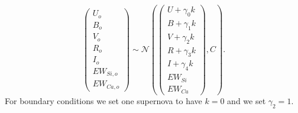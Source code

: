 \documentclass[11pt, oneside]{article}   	%
\begin{document}
\begin{equation}
\left(
\begin{matrix}
U_o\\B_o\\ V_o\\R_o\\I_o\\EW_{Si, o}\\ EW_{Ca, o}
\end{matrix}
\right) \sim \mathcal{N}
\left(
\left(
\begin{matrix}
U +\gamma_0 k \\B +\gamma_1 k \\V+\gamma_2 k\\R+\gamma_3 k\\I+\gamma_4 k\\
EW_{Si}\\ EW_{Ca}
\end{matrix}
\right)
,C
\right).
\end{equation}
For boundary conditions we set one supernova to have $k=0$ and we set $\gamma_2=1$.
%
%
\end{document}
